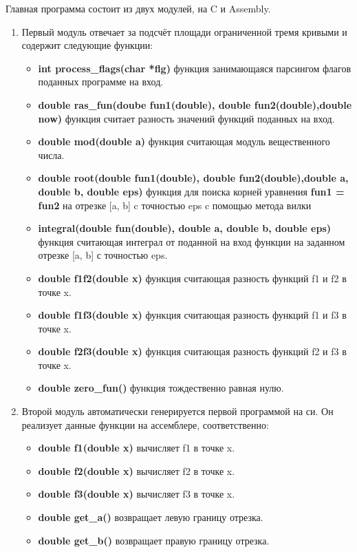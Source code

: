 \documentclass[a4paper,12pt,titlepage,finall]{article}
\begin{document}
Главная программа состоит из двух модулей, на C и Assembly.
\begin{enumerate}
  \item Первый модуль отвечает за подсчёт площади ограниченной тремя кривыми и содержит следующие функции:
  \begin{itemize}
    \item {\bf \ttfamily int process\_flags(char *flg)} функция занимающаяся парсингом флагов поданных программе на вход.
    \item {\bf \ttfamily double ras\_fun(doube fun1(double), double fun2(double),\newline double now)} функция считает разность значений функций поданных на вход.
    \item {\bf \ttfamily double mod(double a)} функция считающая модуль вещественного числа.
    \item {\bf \ttfamily double root(double fun1(double), double fun2(double),\newline double a, double b, double eps)} функция для поиска корней уравнения {\bf \ttfamily fun1 = fun2} на отрезке [a, b] c точностью eps c помощью метода вилки
    \item {\bf \ttfamily integral(double fun(double), double a, double b, double eps)} функция считающая интеграл от поданной на вход функции на заданном отрезке [a, b] с точностью eps.
    \item {\bf \ttfamily double f1f2(double x)} функция считающая разность функций f1 и f2 в точке x.
    \item {\bf \ttfamily double f1f3(double x)} функция считающая разность функций f1 и f3 в точке x.
    \item {\bf \ttfamily double f2f3(double x)} функция считающая разность функций f2 и f3 в точке x.
    \item {\bf \ttfamily double zero\_fun()} функция тождественно равная нулю.
  \end{itemize}
  
  \item Второй модуль автоматически генерируется первой программой на си. Он реализует данные функции на ассемблере, соответственно:
  \begin{itemize}
    \item {\bf \ttfamily double f1(double x)} вычисляет f1 в точке x.
    \item {\bf \ttfamily double f2(double x)} вычисляет f2 в точке x.
    \item {\bf \ttfamily double f3(double x)} вычисляет f3 в точке x.
    \item {\bf \ttfamily double get\_a()} возвращает левую границу отрезка.
    \item {\bf \ttfamily double get\_b()} возвращает правую границу отрезка.
  \end{itemize}
\end{enumerate}
\end{document}
